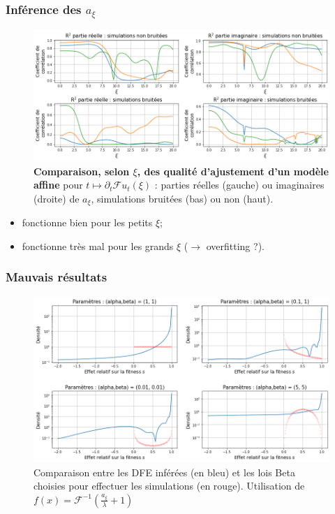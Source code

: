 \documentclass{beamer}
\newcommand{\pth}[1]{\left(#1\right)}
\newcommand{\dr}{\partial}
\newcommand{\fr}{\mathcal{F}}
\begin{document}
\begin{frame}
  \frametitle{Inférence des $a_{\xi}$}

\begin{figure}[h]
  \begin{center}
    \includegraphics[width=0.9\linewidth]{../Img/DFE_R2.png}
  \end{center}
  \caption{\label{fig:DFE_R2}\textbf{Comparaison, selon $\xi$, des qualité d'ajustement d'un modèle affine} pour $t\mapsto \dr_t\fr u_t(\xi)$ : parties réelles (gauche) ou imaginaires (droite) de $a_{\xi}$, simulations bruitées (bas) ou non (haut).}
\end{figure}


\begin{itemize}[label=$\bullet$]
\item fonctionne bien pour les petits $\xi$;
\item fonctionne très mal pour les grands $\xi$ ($\to$ overfitting ?).
\end{itemize}

\end{frame}

\begin{frame}
  \frametitle{Mauvais résultats}
  
  \begin{figure}[h]
    \begin{center}
      \includegraphics[width=0.9\linewidth]{../Img/DFE_inferred.png}
    \end{center}
    \caption{\label{fig:DFE}Comparaison entre les DFE inférées (en bleu) et les lois Beta choisies pour effectuer les simulations (en rouge). Utilisation de $f(x)=\fr^{-1}\pth{\frac{a_{\xi}}{\lambda}+1}$}
  \end{figure}


\end{frame}
\end{document}
